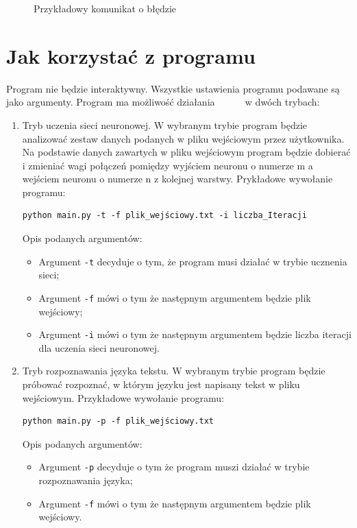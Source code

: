 \documentclass[8pt]{article}
\begin{document}
\begin{figure}[h]
\caption{Przykładowy komunikat o błędzie}
\label{fig:image}
\end{figure}
\section{Jak korzystać z programu}
\hspace*{1 cm} Program nie będzie interaktywny. Wszystkie ustawienia programu podawane są jako argumenty. Program ma możliwość działania ~~~~~ w dwóch trybach: 
\begin{enumerate}
\item Tryb uczenia sieci neuronowej. W wybranym trybie program będzie analizować  zestaw danych podanych w pliku wejściowym przez użytkownika. Na podstawie danych zawartych w pliku wejściowym program będzie dobierać i zmieniać wagi połączeń pomiędzy wyjściem neuronu o numerze m a wejściem neuronu o numerze n z kolejnej warstwy. Prykładowe wywołanie programu: \newline 
\begin{verbatim}
python main.py -t -f plik_wejściowy.txt -i liczba_Iteracji
\end{verbatim}
Opis podanych argumentów:
\begin{itemize}
\item Argument \texttt{-t} decyduje o tym, że program musi działać w trybie ucznenia sieci;
\item Argument \texttt{-f} mówi o tym że następnym argumentem będzie  plik wejściowy;
\item Argument \texttt{-i} mówi o tym że następnym argumentem będzie liczba iteracji dla uczenia sieci neuronowej.
\end{itemize}
\item Tryb rozpoznawania języka tekstu. W wybranym trybie program będzie próbować rozpoznać, w którym języku jest napisany tekst w pliku wejściowym. Przykładowe wywołanie programu:
\begin{verbatim}
python main.py -p -f plik_wejściowy.txt 
\end{verbatim}
Opis podanych argumentów:
\begin{itemize}
\item Argument \texttt{-p} decyduje o tym że program muszi działać w trybie rozpoznawania języka;
\item Argument \texttt{-f} mówi o tym że następnym argumentem będzie  plik wejściowy.
\end{itemize}
\end{enumerate}
\end{document}
